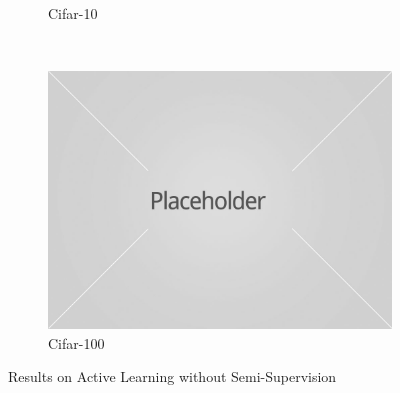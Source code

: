 \documentclass{article}
\begin{document}
\begin{figure}
\begin{subfigure}[b]{0.3239\textwidth}
        \caption{Cifar-10}
    \end{subfigure}
    ~ %
    \begin{subfigure}[b]{0.3239\textwidth}
        \includegraphics[width=\textwidth]{placeholder1.jpg}
        \caption{Cifar-100}
    \end{subfigure}
    \caption{Results on Active Learning without Semi-Supervision}\label{fig:resnosemi}
\end{figure}
\end{document}
